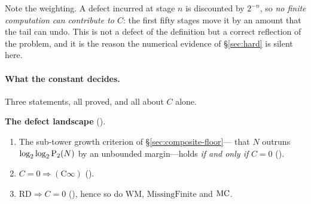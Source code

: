 \noindent
Note the weighting.  A defect incurred at stage $n$ is discounted by
$2^{-n}$, so \emph{no finite computation can contribute to $C$}: the
first fifty stages move it by an amount that the tail can undo.  This is
not a defect of the definition but a correct reflection of the problem,
and it is the reason the numerical evidence of \S\ref{sec:hard} is
silent here.

\paragraph{What the constant decides.}
Three statements, all proved, and all about $C$ alone.

\begin{keyresult}
\textbf{The defect landscape}
().
\begin{enumerate}[nosep,leftmargin=*]
\item The sub-tower growth criterion of \S\ref{sec:composite-floor}---%
that $N$ outruns $\log_2\log_2\mathrm{P}_{2}(N)$ by an unbounded margin---holds
\emph{if and only if} $C = 0$
().
\item $C = 0 \Rightarrow (\mathrm{C}\infty)$
().
\item $\mathrm{RD} \Rightarrow C = 0$
(),
hence so do $\mathrm{WM}$, $\mathrm{MissingFinite}$ and $\mathrm{MC}$.
\end{enumerate}
\end{keyresult}

